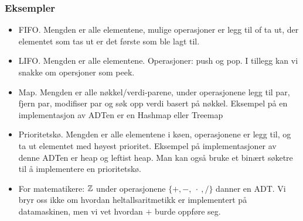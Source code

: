 \subsubsection{Eksempler}
\begin{itemize}
	\item FIFO. Mengden  er alle elementene, mulige operasjoner er legg til of ta ut, der elementet som tas ut er det første som ble lagt til.
	\item LIFO. Mengden er alle elementene. Operasjoner: push og pop. I tillegg kan vi snakke om opersjoner som peek.
	\item Map. Mengden er alle nøkkel/verdi-parene, under operasjonene legg til par, fjern par, modifiser par og søk opp verdi basert på nøkkel. Eksempel på en implementasjon av ADTen  er en Hashmap eller Treemap
	\item Prioritetskø. Mengden er alle elementene i køen, operasjonene er legg til, og ta ut elementet med høyest prioritet. Eksempel på implementasjoner av denne ADTen er heap og leftist heap. Man kan også bruke et binært søketre til å implementere en prioritetskø.
	\item For matematikere: $ \mathbb{Z} $ under operasjonene $ \{+, -, ~\cdot~, /\} $ danner en ADT. Vi bryr oss ikke om hvordan heltallsaritmetikk er implementert på datamaskinen, men vi vet hvordan $ + $ burde oppføre seg.
\end{itemize}

